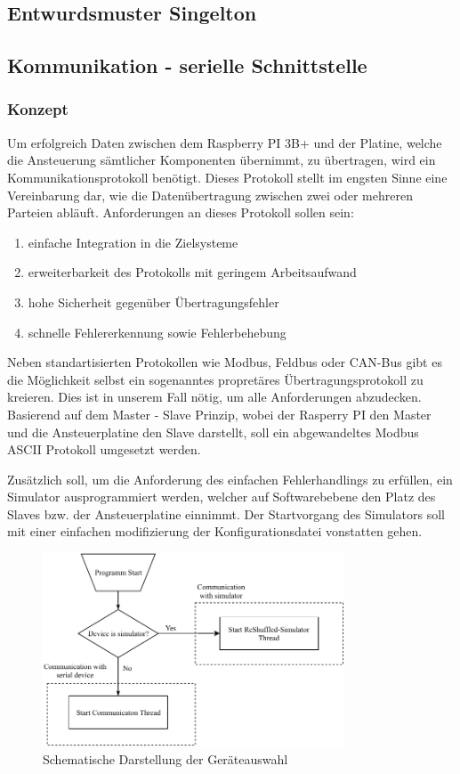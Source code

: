 \subsection{Entwurdsmuster Singelton}
\subsection{Kommunikation - serielle Schnittstelle}
\subsubsection{Konzept}

Um erfolgreich Daten zwischen dem Raspberry PI 3B+ und der Platine, welche die Ansteuerung sämtlicher Komponenten übernimmt, zu übertragen, wird ein Kommunikationsprotokoll benötigt.
Dieses Protokoll stellt im engsten Sinne eine Vereinbarung dar, wie die Datenübertragung zwischen zwei oder mehreren Parteien abläuft.
Anforderungen an dieses Protokoll sollen sein:
\begin{enumerate}
    \item einfache Integration in die Zielsysteme
    \item erweiterbarkeit des Protokolls mit geringem Arbeitsaufwand
    \item hohe Sicherheit gegenüber Übertragungsfehler
    \item schnelle Fehlererkennung sowie Fehlerbehebung
\end{enumerate}
Neben standartisierten Protokollen wie Modbus, Feldbus oder CAN-Bus gibt es die Möglichkeit selbst ein sogenanntes propretäres Übertragungsprotokoll zu kreieren. Dies ist in unserem Fall nötig, um alle Anforderungen abzudecken.
Basierend auf dem Master - Slave Prinzip, wobei der Rasperry PI den Master und die Ansteuerplatine den Slave darstellt, soll ein abgewandeltes Modbus ASCII Protokoll umgesetzt werden.

Zusätzlich soll, um die Anforderung des einfachen Fehlerhandlings zu erfüllen, ein Simulator ausprogrammiert werden, welcher auf Softwarebebene den Platz des Slaves bzw. der Ansteuerplatine einnimmt.
Der Startvorgang des Simulators soll mit einer einfachen modifizierung der Konfigurationsdatei vonstatten gehen.

\begin{figure}[H]
    \centering
    \includegraphics[width=0.8\textwidth]{fig/ainf/DeviceSelection}
    \caption{Schematische Darstellung der Geräteauswahl}
\end{figure}
